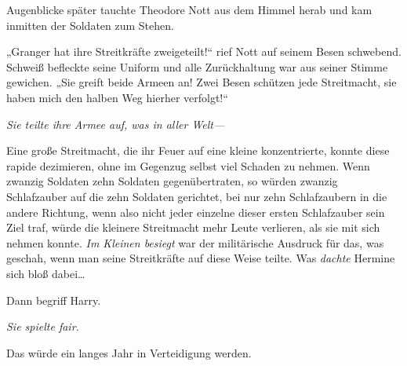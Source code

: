 Augenblicke später tauchte Theodore Nott aus dem Himmel herab und kam inmitten der Soldaten zum Stehen.

„Granger hat ihre Streitkräfte zweigeteilt!“ rief Nott auf seinem Besen schwebend. Schweiß befleckte seine Uniform und alle Zurückhaltung war aus seiner Stimme gewichen. „Sie greift beide Armeen an! Zwei Besen schützen jede Streitmacht, sie haben mich den halben Weg hierher verfolgt!“

\emph{Sie teilte ihre Armee auf, was in aller Welt—}

Eine große Streitmacht, die ihr Feuer auf eine kleine konzentrierte, konnte diese rapide dezimieren, ohne im Gegenzug selbst viel Schaden zu nehmen. Wenn zwanzig Soldaten zehn Soldaten gegenübertraten, so würden zwanzig Schlafzauber auf die zehn Soldaten gerichtet, bei nur zehn Schlafzaubern in die andere Richtung, wenn also nicht jeder einzelne dieser ersten Schlafzauber sein Ziel traf, würde die kleinere Streitmacht mehr Leute verlieren, als sie mit sich nehmen konnte. \emph{Im Kleinen besiegt} war der militärische Ausdruck für das, was geschah, wenn man seine Streitkräfte auf diese Weise teilte. Was \emph{dachte} Hermine sich bloß dabei…%

Dann begriff Harry.

\emph{Sie spielte fair.}

Das würde ein langes Jahr in Verteidigung werden.

